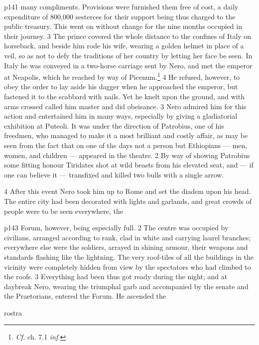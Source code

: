 p141 many compliments. Provisions were furnished them free of cost, a daily expenditure of 800,000 sesterces for their support being thus charged to the public treasury. This went on without change for the nine months occupied in their journey. 3 The prince covered the whole distance to the confines of Italy on horseback, and beside him rode his wife, wearing a golden helmet in place of a veil, so as not to defy the traditions of her country by letting her face be seen. In Italy he was conveyed in a two-horse carriage sent by Nero, and met the emperor at Neapolis, which he reached by way of Picenum.\texthebrew{⁠}\footnote{\emph{Cf.} ch. 7.1 \emph{inf.}

} 4 He refused, however, to obey the order to lay aside his dagger when he approached the emperor, but fastened it to the scabbard with nails. Yet he knelt upon the ground, and with arms crossed called him master and did obeisance. 3 Nero admired him for this action and entertained him in many ways, especially by giving a gladiatorial exhibition at Puteoli. It was under the direction of Patrobius, one of his freedmen, who managed to make it a most brilliant and costly affair, as may be seen from the fact that on one of the days not a person but Ethiopians \texthebrew{—} men, women, and children \texthebrew{—} appeared in the theatre. 2 By way of showing Patrobius some fitting honour Tiridates shot at wild beasts from his elevated seat, and \texthebrew{—} if one can believe it \texthebrew{—} transfixed and killed two bulls with a single arrow.

4
After this event Nero took him up to Rome and set the diadem upon his head. The entire city had been decorated with lights and garlands, and great crowds of people were to be seen everywhere, the

p143 Forum, however, being especially full. 2 The centre was occupied by civilians, arranged according to rank, clad in white and carrying laurel branches; everywhere else were the soldiers, arrayed in shining armour, their weapons and standards flashing like the lightning. The very roof-tiles of all the buildings in the vicinity were completely hidden from view by the spectators who had climbed to the roofs. 3 Everything had been thus got ready during the night; and at daybreak Nero, wearing the triumphal garb and accompanied by the senate and the Praetorians, entered the Forum. He ascended the

rostra

